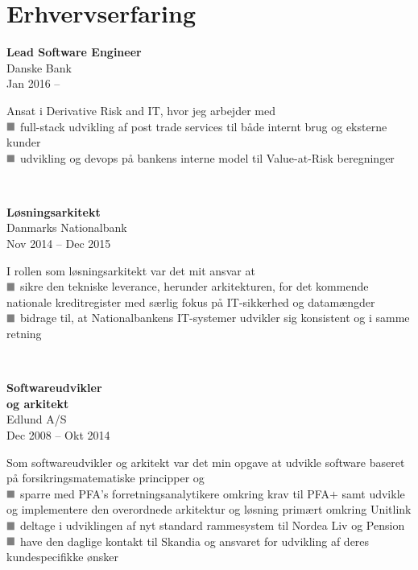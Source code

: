 \documentclass[10pt, a4paper]{article}
\newcommand*{\greysquare}{\textcolor{gray}{\blacksquare}}
\begin{document}
\section{Erhvervserfaring}
\begin{Row}%
  \begin{Cell}{1}
    \textbf{Lead Software Engineer} \\ [1ex]
    Danske Bank \\
    Jan 2016 -- %
  \end{Cell}
  \begin{Cell}{3}
    Ansat i Derivative Risk and IT, hvor jeg arbejder med \\ [1ex]
    $\greysquare$ full-stack udvikling af post trade services til både internt
    brug og eksterne kunder \\
    $\greysquare$ udvikling og devops på bankens interne model til Value-at-Risk
     beregninger \\
  \end{Cell}
\end{Row}
\\[0.5cm]\begin{Row}%
  \begin{Cell}{1}
    \textbf{Løsningsarkitekt} \\ [1ex]
    Danmarks Nationalbank \\
    Nov 2014 -- Dec 2015 %
  \end{Cell}
  \begin{Cell}{3}
    I rollen som løsningsarkitekt var det mit ansvar at \\ [1ex]
    $\greysquare$ sikre den tekniske leverance, herunder arkitekturen, for det
    kommende nationale kreditregister med særlig fokus på IT-sikkerhed og
    datamængder \\
    $\greysquare$ bidrage til, at Nationalbankens IT-systemer udvikler sig
    konsistent og i samme retning
  \end{Cell}
\end{Row}
\\[0.5cm]
\begin{Row}
  \begin{Cell}{1}
    \textbf{Softwareudvikler \\
    og arkitekt} \\ [1ex]
    Edlund A/S \\
    Dec 2008 -- Okt 2014 %
  \end{Cell}
  \begin{Cell}{3}
    Som softwareudvikler og arkitekt var det min opgave at udvikle software
    baseret på forsikringsmatematiske principper og \\ [1ex]
    $\greysquare$ sparre med PFA's forretningsanalytikere omkring krav til
    PFA$+$ samt udvikle og implementere den overordnede arkitektur og løsning
    primært omkring Unitlink \\
    $\greysquare$ deltage i udviklingen af nyt standard rammesystem til Nordea
    Liv og Pension \\
    $\greysquare$ have den daglige kontakt til Skandia og ansvaret for udvikling
    af deres kundespecifikke ønsker
  \end{Cell}
\end{Row}
\end{document}
